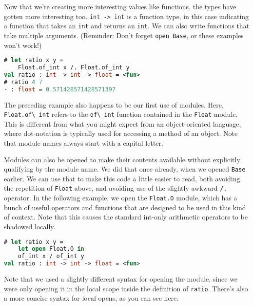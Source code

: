 Now that we're creating more interesting values like functions, the
types have gotten more interesting too.
\passthrough{\lstinline!int -> int!} is a function type, in this case
indicating a function that takes an \passthrough{\lstinline!int!} and
returns an \passthrough{\lstinline!int!}. We can also write functions
that take multiple arguments. (Reminder: Don't forget
\passthrough{\lstinline!open Base!}, or these examples won't work!)

\begin{lstlisting}[language=Caml]
# let ratio x y =
    Float.of_int x /. Float.of_int y
val ratio : int -> int -> float = <fun>
# ratio 4 7
- : float = 0.571428571428571397
\end{lstlisting}

The preceding example also happens to be our first use of modules. Here,
\passthrough{\lstinline!Float.of\_int!} refers to the
\passthrough{\lstinline!of\_int!} function contained in the
\passthrough{\lstinline!Float!} module. This is different from what you
might expect from an object-oriented language, where dot-notation is
typically used for accessing a method of an object. Note that module
names always start with a capital letter.

Modules can also be opened to make their contents available without
explicitly qualifying by the module name. We did that once already, when
we opened \passthrough{\lstinline!Base!} earlier. We can use that to
make this code a little easier to read, both avoiding the repetition of
\passthrough{\lstinline!Float!} above, and avoiding use of the slightly
awkward \passthrough{\lstinline!/.!} operator. In the following example,
we open the \passthrough{\lstinline!Float.O!} module, which has a bunch
of useful operators and functions that are designed to be used in this
kind of context. Note that this causes the standard int-only arithmetic
operators to be shadowed locally.

\begin{lstlisting}[language=Caml]
# let ratio x y =
    let open Float.O in
    of_int x / of_int y
val ratio : int -> int -> float = <fun>
\end{lstlisting}

Note that we used a slightly different syntax for opening the module,
since we were only opening it in the local scope inside the definition
of \passthrough{\lstinline!ratio!}. There's also a more concise syntax
for local opens, as you can see here.

